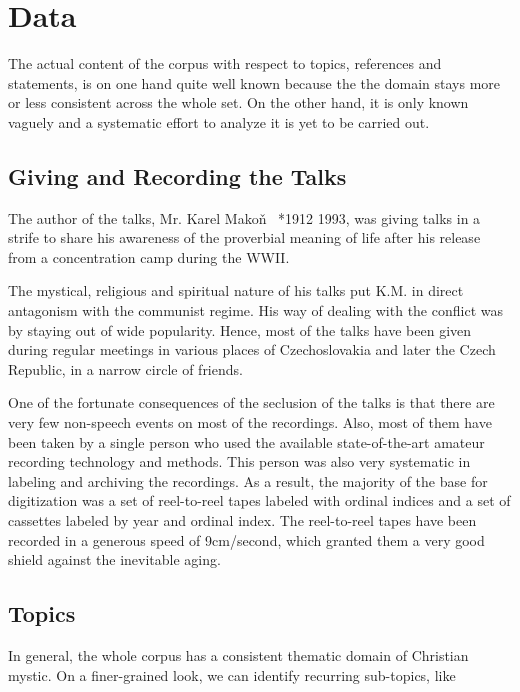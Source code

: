 \documentclass[12pt,a4paper]{report}
\begin{document}

\chapter{Data}

The actual content of the corpus with respect to topics, references and
statements, is on one hand quite well known
because the the domain stays
more or less consistent across the whole set. On the other hand, it is only
known vaguely and a systematic effort to analyze it is yet to be carried out.

\section{Giving and Recording the Talks}

The author of the talks, Mr. Karel Mako\v{n}~\cite{hajek2007cesky} *1912
\textdagger{}1993, was giving talks in a strife to share his awareness of the
proverbial meaning of life after his
release from a concentration camp during the WWII.

The mystical, religious and spiritual nature of his talks put K.M. in
direct antagonism with the communist regime.  His way of dealing
with the conflict was by staying out of wide popularity. Hence, most of the
talks have been given during regular meetings in various places of
Czechoslovakia and later the Czech Republic, in a narrow circle of friends.

One of the fortunate consequences of the seclusion of the talks is that there are
very few non-speech events on most of the recordings. Also, most of them
have been taken by a single person who used the available state-of-the-art
amateur recording technology and methods. This person was also very systematic
in labeling and archiving the recordings. As a result, the majority of the base
for digitization was a set of reel-to-reel tapes labeled with ordinal indices
and a set of cassettes labeled by year and ordinal index. The reel-to-reel tapes
have been recorded in a generous speed of 9cm/second, which granted them a very
good shield against the inevitable aging.

\section{Topics}

In general, the whole corpus has a consistent thematic domain of Christian mystic. On a
finer-grained look, we can identify recurring sub-topics, like
\end{document}
